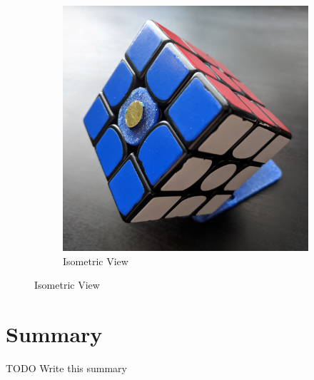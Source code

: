 \begin{figure}[h]
\begin{subfigure}{.30\textwidth}
    \end{subfigure}
    \begin{subfigure}{.30\textwidth}
        \centering
        \caption{Isometric View}
        \label{fig:core-placement-isometric}
        \includegraphics[width=\linewidth]{Figures/6 PCB Design/core_placement_isometric_square.jpg}
    \end{subfigure}
\end{figure}


\section{Summary}

TODO Write this summary
